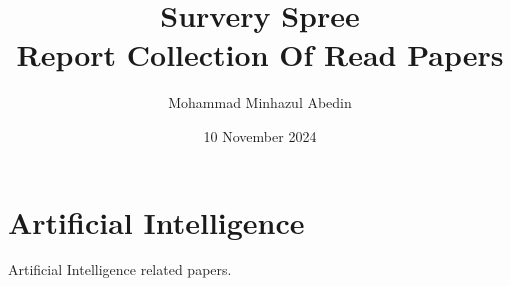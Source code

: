 \documentclass[]{report}
\title{Survery Spree \\ 
{\large Report Collection Of Read Papers } }
\author{Mohammad Minhazul Abedin}
\date{10 November 2024}
\begin{document}


\chapter{Artificial Intelligence}
Artificial Intelligence related papers.




\nocite{*}


\end{document}
